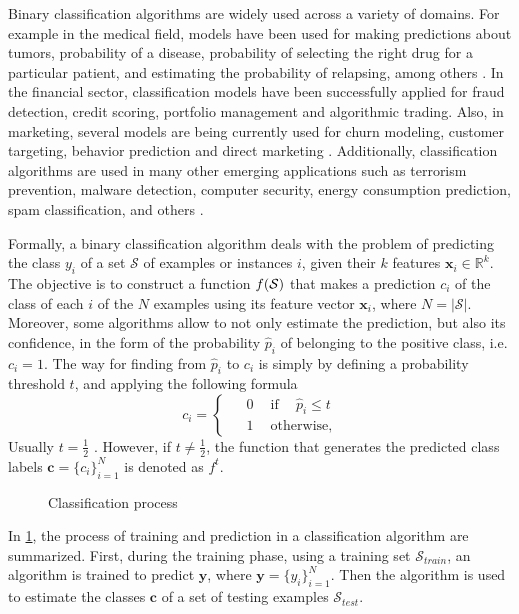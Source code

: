 Binary classification algorithms are widely used across a variety of domains. For example in the 
medical field, models have been used for making predictions about tumors, probability 
of a disease, probability of selecting the right drug for a particular patient, and estimating the 
probability of relapsing, among others \citep{Herland2014}. In the financial sector, classification 
models have been successfully applied for fraud detection, credit scoring, portfolio management and 
algorithmic trading. Also, in marketing, several models are being currently used for churn modeling, 
customer targeting, behavior prediction and direct marketing \citep{Baesens2014}. Additionally, 
classification algorithms are used in many other emerging applications such as terrorism 
prevention, malware detection, computer security, energy consumption prediction, spam 
classification, and others \citep{Kriegel2007}.

Formally, a binary classification algorithm deals with the problem	of predicting the class $y_i$ 
of a set $\mathcal{S}$ of examples or instances $i$, given their $k$ features \mbox{$\mathbf{x}_i 
\in \mathbb{R}^k$}. The objective is to construct a function $f(\cal{S})$ that makes a prediction 
$c_i$ of the class of each $i$ of the $N$ examples using its feature vector $\mathbf{x}_i$, where 
$N=\vert \mathcal{S} \vert$. Moreover, some algorithms allow to not only estimate the prediction, 
but also its confidence, in the form of the probability $\hat p_i$ of belonging to the positive 
class, i.e. $c_i = 1$. The way for finding from $\hat p_i$ to $c_i$ is simply by defining a 
probability threshold $t$, and applying the following formula
\begin{equation}\label{eq_pred}
  c_i = 
  \begin{cases}
    \phantom{-}0 \phantom{-} \mbox{if} \phantom{-} \hat p_i \le t\\
    \phantom{-}1 \phantom{-}\mbox{otherwise,}
  \end{cases}
\end{equation}
Usually $t=\frac{1}{2}$ \citep{Hastie2009}. However, if $t \ne \frac{1}{2}$, the 
function that generates the predicted class labels $\mathbf{c}=\{c_i\}_{i=1}^{N}$ is denoted as 
$f^t$.

\begin{figure}
	\centering
	
  \caption{Classification process}
  \label{fig:2:1}
\end{figure}

In \figurename{ \ref{fig:2:1}}, the process of training and prediction in a classification 
algorithm are summarized. First, during the training phase, using a training set 
$\mathcal{S}_{train}$, an algorithm is trained to predict $\mathbf{y}$, where
$\mathbf{y}=\{y_i\}_{i=1}^{N}$. Then the algorithm is used to estimate the classes 
$\mathbf{c}$ of a set of testing examples $\mathcal{S}_{test}$.

